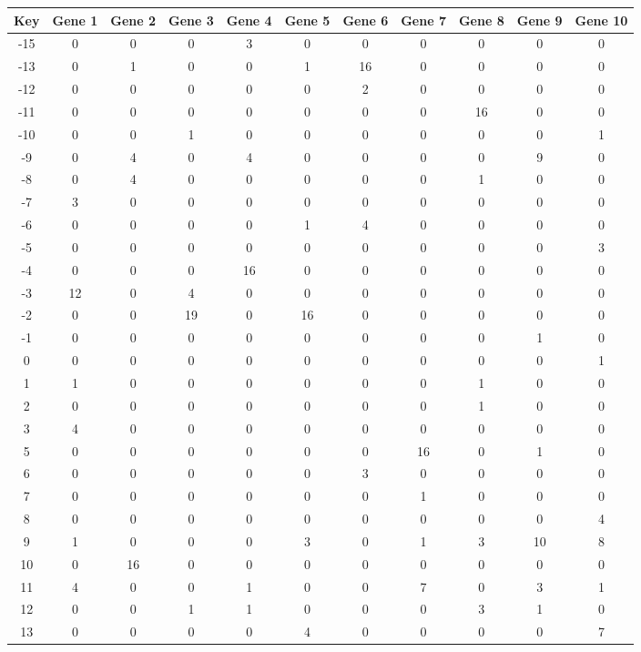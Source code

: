 \begin{tabular}{|c|c|c|c|c|c|c|c|c|c|c|}
\hline
Key & Gene 1 & Gene 2 & Gene 3 & Gene 4 & Gene 5 & Gene 6 & Gene 7 & Gene 8 & Gene 9 & Gene 10 \\
\hline
-15 & 0 & 0 & 0 & 3 & 0 & 0 & 0 & 0 & 0 & 0 \\
-13 & 0 & 1 & 0 & 0 & 1 & 16 & 0 & 0 & 0 & 0 \\
-12 & 0 & 0 & 0 & 0 & 0 & 2 & 0 & 0 & 0 & 0 \\
-11 & 0 & 0 & 0 & 0 & 0 & 0 & 0 & 16 & 0 & 0 \\
-10 & 0 & 0 & 1 & 0 & 0 & 0 & 0 & 0 & 0 & 1 \\
-9 & 0 & 4 & 0 & 4 & 0 & 0 & 0 & 0 & 9 & 0 \\
-8 & 0 & 4 & 0 & 0 & 0 & 0 & 0 & 1 & 0 & 0 \\
-7 & 3 & 0 & 0 & 0 & 0 & 0 & 0 & 0 & 0 & 0 \\
-6 & 0 & 0 & 0 & 0 & 1 & 4 & 0 & 0 & 0 & 0 \\
-5 & 0 & 0 & 0 & 0 & 0 & 0 & 0 & 0 & 0 & 3 \\
-4 & 0 & 0 & 0 & 16 & 0 & 0 & 0 & 0 & 0 & 0 \\
-3 & 12 & 0 & 4 & 0 & 0 & 0 & 0 & 0 & 0 & 0 \\
-2 & 0 & 0 & 19 & 0 & 16 & 0 & 0 & 0 & 0 & 0 \\
-1 & 0 & 0 & 0 & 0 & 0 & 0 & 0 & 0 & 1 & 0 \\
0 & 0 & 0 & 0 & 0 & 0 & 0 & 0 & 0 & 0 & 1 \\
1 & 1 & 0 & 0 & 0 & 0 & 0 & 0 & 1 & 0 & 0 \\
2 & 0 & 0 & 0 & 0 & 0 & 0 & 0 & 1 & 0 & 0 \\
3 & 4 & 0 & 0 & 0 & 0 & 0 & 0 & 0 & 0 & 0 \\
5 & 0 & 0 & 0 & 0 & 0 & 0 & 16 & 0 & 1 & 0 \\
6 & 0 & 0 & 0 & 0 & 0 & 3 & 0 & 0 & 0 & 0 \\
7 & 0 & 0 & 0 & 0 & 0 & 0 & 1 & 0 & 0 & 0 \\
8 & 0 & 0 & 0 & 0 & 0 & 0 & 0 & 0 & 0 & 4 \\
9 & 1 & 0 & 0 & 0 & 3 & 0 & 1 & 3 & 10 & 8 \\
10 & 0 & 16 & 0 & 0 & 0 & 0 & 0 & 0 & 0 & 0 \\
11 & 4 & 0 & 0 & 1 & 0 & 0 & 7 & 0 & 3 & 1 \\
12 & 0 & 0 & 1 & 1 & 0 & 0 & 0 & 3 & 1 & 0 \\
13 & 0 & 0 & 0 & 0 & 4 & 0 & 0 & 0 & 0 & 7 \\
\hline
\end{tabular}